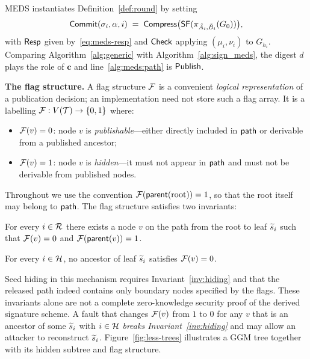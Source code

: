 \begin{remark}
MEDS instantiates Definition~\ref{def:round} by setting
\[
  \mathsf{Commit}(\sigma_i,\alpha,i) \;=\;
  \mathsf{Compress}\bigl(\mathsf{SF}(\pi_{\tilde{A}_i,\tilde{B}_i}(G_0))\bigr),
\]
with $\mathsf{Resp}$ given by~\eqref{eq:meds-resp} and $\mathsf{Check}$ applying
$(\mu_i,\nu_i)$ to $G_{h_i}$. Comparing Algorithm~\ref{alg:generic} with
Algorithm~\ref{alg:sign_meds}, the digest $d$ plays the role of $\mathbf{c}$
and line~\ref{alg:meds:path} is $\mathsf{Publish}$.
\end{remark}
\textbf{The flag structure.}
A flag structure $\mathcal{F}$ is a convenient \emph{logical representation}
of a publication decision; an implementation need not store such a flag array.  It is a labelling $\mathcal{F} : V(\mathcal{T}) \to \{0,1\}$ where:
\begin{itemize}
  \item $\mathcal{F}(v) = 0$: node $v$ is \emph{publishable}---either
        directly included in $\mathsf{path}$ or derivable from a published ancestor;
  \item $\mathcal{F}(v) = 1$: node $v$ is \emph{hidden}---it must not appear in $\mathsf{path}$ and must not be derivable from published nodes.
\end{itemize}
Throughout we use the convention $\mathcal{F}(\mathsf{parent}(\mathrm{root})) = 1$,
so that the root itself may belong to $\mathsf{path}$. The flag structure satisfies
two invariants:

\begin{invariant}[Correctness]
\label{inv:correctness}
For every $i \in \mathcal{R}$ there exists a node $v$ on the path from the root to
leaf $\widetilde{s}_i$ such that $\mathcal{F}(v) = 0$ and $\mathcal{F}(\mathsf{parent}(v)) = 1$.
\end{invariant}

\begin{invariant}[ZK hiding]
\label{inv:hiding}
For every $i \in \mathcal{H}$, no ancestor of leaf $\widetilde{s}_i$ satisfies $\mathcal{F}(v) = 0$.
\end{invariant}

Seed hiding in this mechanism requires Invariant~\ref{inv:hiding}
and that the released path indeed contains only boundary nodes specified
by the flags. These invariants alone are not a complete zero-knowledge
security proof of the derived signature scheme. A fault that
changes $\mathcal{F}(v)$ from $1$ to $0$ for any $v$ that is an ancestor of some
$\widetilde{s}_i$ with $i \in \mathcal{H}$ \emph{breaks Invariant~\ref{inv:hiding}} and
may allow an attacker to reconstruct $\widetilde{s}_i$.
Figure~\ref{fig:less-trees} illustrates a GGM tree together with its hidden
subtree and flag structure.

